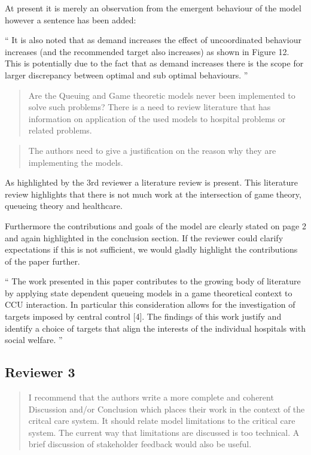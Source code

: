 \documentclass{article}
\begin{document}
At present it is merely an observation from the emergent behaviour of the model however a sentence has been added:

``
It is also noted that as demand increases the effect of uncoordinated behaviour increases (and the recommended target also increases) as shown in Figure 12. This is potentially due to the fact that as demand increases there is the scope for larger discrepancy between optimal and sub optimal behaviours.
''

\begin{quote}
    \begin{textit}{
    Are the Queuing and Game theoretic models never been implemented to solve such problems? There is a need to review literature that has information on application of the used models to hospital problems or related problems.
    }\end{textit}
\end{quote}

\begin{quote}
    \begin{textit}{
The authors need to give a justification on the reason why they are implementing the models.
    }\end{textit}
\end{quote}

As highlighted by the 3rd reviewer a literature review is present. This
literature review highlights that there is not much work at the intersection of
game theory, queueing theory and healthcare.

Furthermore the contributions and goals of the model are clearly stated on page
2 and again highlighted in the conclusion section. If the reviewer could
clarify expectations if this is not sufficient, we would gladly highlight the
contributions of the paper further.

``
The work presented in this paper contributes to the growing body of literature
by applying state dependent queueing models in a game theoretical context to CCU
interaction.  In particular this consideration allows for the investigation of
targets imposed by central control [4].  The findings of this work justify and
identify a choice of targets that align the interests of the individual
hospitals with social welfare.
''

\subsection{Reviewer 3}


\begin{quote}
    \begin{textit}
        {I recommend that the authors write a more complete and coherent
        Discussion and/or Conclusion which places their work in the context of
        the critcal care system.  It should relate model limitations to the
        critical care system. The current way that limitations are discussed
        is too technical. A brief discussion of stakeholder feedback would
        also be useful.}
    \end{textit}
\end{quote}
\end{document}
